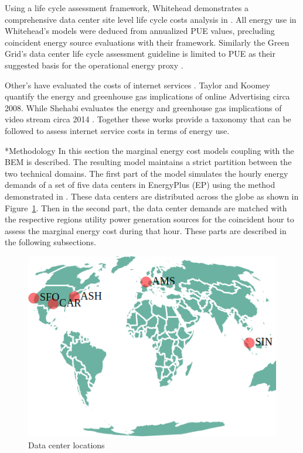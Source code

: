 \documentclass[twocolumn, a4paper,10pt]{article}
\makeatletter
\renewcommand\section{\@startsection{section}{1}{\z@}{3pt}{3pt}{\normalfont\large\bfseries}}
\makeatother
\begin{document}
Using a life cycle assessment framework, Whitehead demonstrates a comprehensive data center site level life cycle costs analysis in \citep{whitehead15}. All energy use in Whitehead’s models were deduced from annualized PUE values, precluding coincident energy source evaluations with their framework. Similarly the Green Grid’s data center life cycle assessment guideline is limited to PUE as their suggested basis for the operational energy proxy \citep{tgg12}.

Other’s have evaluated the costs of internet services \citep{koomey08} \citep{shehabi14}. Taylor and Koomey quantify the energy and greenhouse gas implications of online Advertising circa 2008. While Shehabi evaluates the energy and greenhouse gas implications of video stream circa 2014 \citep{shehabi14}. Together these works provide a taxonomy that can be followed to assess internet service costs in terms of energy use. 



\section*{Methodology}
In this section the marginal energy cost model\textsc{}s coupling with the BEM is described. The resulting model maintains a strict partition between the two technical domains. The first part of the model simulates the hourly energy demands of a set of five data centers in EnergyPlus (EP) using the method demonstrated in \citep{kumar20}. These data centers are distributed across the globe as shown in Figure~\ref{fig:dc_locations}. Then in the second part, the data center demands are matched with the respective region\textsc{}s utility power generation sources for the coincident hour to assess the marginal energy cost during that hour. These parts are described in the following subsections. 

\begin{figure}
  \centering
  \includegraphics[scale=.40]{img/dc_locations.png}
  \caption{ Data center locations}
  \label{fig:dc_locations}
  \end{figure}
\end{document}
